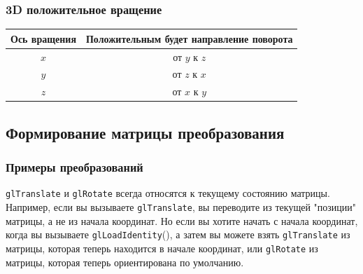 \documentclass[a4paper, 14pt]{extarticle}
\begin{document}
\subsubsection{3D положительное вращение}
\begin{tabular}{| c | c |}
	\hline
	\textbf{Ось вращения} & \textbf{Положительным будет направление поворота} \\
	\hline
	$x$ & от $y$ к $z$\\
	\hline
	$y$ & от $z$ к $x$\\
	\hline
	$z$ & от $x$ к $y$\\
	\hline
\end{tabular}

\subsection{Формирование матрицы преобразования}
\subsubsection{Примеры преобразований}
\texttt{glTranslate} и \texttt{glRotate} всегда относятся к текущему состоянию матрицы. Например, если вы вызываете \texttt{glTranslate}, вы переводите из текущей "позиции" матрицы, а не из начала координат. Но если вы хотите начать с начала координат, когда вы вызываете \texttt{glLoadIdentity}(), а затем вы можете взять \texttt{glTranslate} из матрицы, которая теперь находится в начале координат, или \texttt{glRotate} из матрицы, которая теперь ориентирована по умолчанию.
\end{document}
